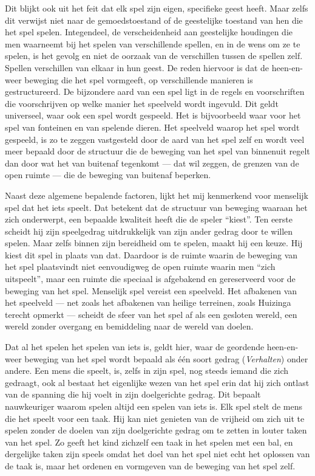 Dit blijkt ook uit het feit dat elk spel zijn eigen, specifieke geest heeft. Maar zelfs dit verwijst niet naar de gemoedstoestand of de geestelijke toestand van hen die het spel spelen. Integendeel, de verscheidenheid aan geestelijke houdingen die men waarneemt bij het spelen van verschillende spellen, en in de wens om ze te spelen, is het gevolg en niet de oorzaak van de verschillen tussen de spellen zelf. Spellen verschillen van elkaar in hun geest. De reden hiervoor is dat de heen-en-weer beweging die het spel vormgeeft, op verschillende manieren is gestructureerd. De bijzondere aard van een spel ligt in de regels en voorschriften die voorschrijven op welke manier het speelveld wordt ingevuld. Dit geldt universeel, waar ook een spel wordt gespeeld. Het is bijvoorbeeld waar voor het spel van fonteinen en van spelende dieren. Het speelveld waarop het spel wordt gespeeld, is zo te zeggen vastgesteld door de aard van het spel zelf en wordt veel meer bepaald door de structuur die de beweging van het spel van binnenuit regelt dan door wat het van buitenaf tegenkomt — dat wil zeggen, de grenzen van de open ruimte — die de beweging van buitenaf beperken.

Naast deze algemene bepalende factoren, lijkt het mij kenmerkend voor menselijk spel dat het iets speelt. Dat betekent dat de structuur van beweging waaraan het zich onderwerpt, een bepaalde kwaliteit heeft die de speler ``kiest''. Ten eerste scheidt hij zijn speelgedrag uitdrukkelijk van zijn ander gedrag door te willen spelen. Maar zelfs binnen zijn bereidheid om te spelen, maakt hij een keuze. Hij kiest dit spel in plaats van dat. Daardoor is de ruimte waarin de beweging van het spel plaatsvindt niet eenvoudigweg de open ruimte waarin men ``zich uitspeelt'', maar een ruimte die speciaal is afgebakend en gereserveerd voor de beweging van het spel. Menselijk spel vereist een speelveld. Het afbakenen van het speelveld — net zoals het afbakenen van heilige terreinen, zoals Huizinga terecht opmerkt — scheidt de sfeer van het spel af als een gesloten wereld, een wereld zonder overgang en bemiddeling naar de wereld van doelen.

Dat al het spelen het spelen van iets is, geldt hier, waar de geordende heen-en-weer beweging van het spel wordt bepaald als één soort gedrag (\textit{Verhalten}) onder andere. Een mens die speelt, is, zelfs in zijn spel, nog steeds iemand die zich gedraagt, ook al bestaat het eigenlijke wezen van het spel erin dat hij zich ontlast van de spanning die hij voelt in zijn doelgerichte gedrag. Dit bepaalt nauwkeuriger waarom spelen altijd een spelen van iets is. Elk spel stelt de mens die het speelt voor een taak. Hij kan niet genieten van de vrijheid om zich uit te spelen zonder de doelen van zijn doelgerichte gedrag om te zetten in louter taken van het spel. Zo geeft het kind zichzelf een taak in het spelen met een bal, en dergelijke taken zijn speels omdat het doel van het spel niet echt het oplossen van de taak is, maar het ordenen en vormgeven van de beweging van het spel zelf.

